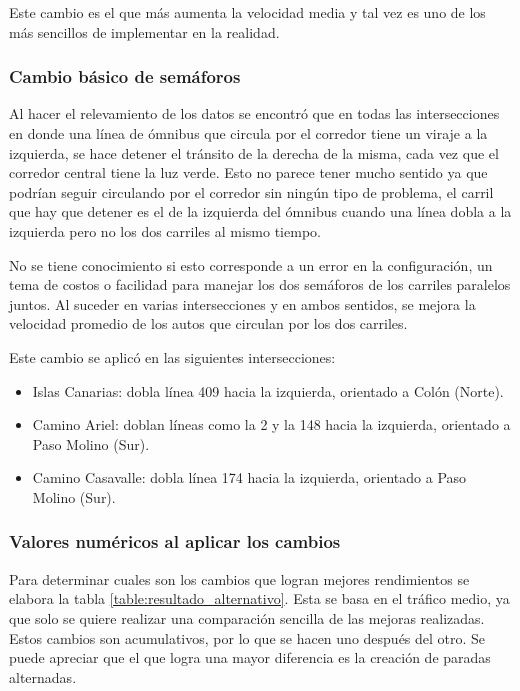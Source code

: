 Este cambio es el que más aumenta la velocidad media y tal vez es uno de los más sencillos de implementar en la realidad.



\subsubsection{Cambio básico de semáforos}
Al hacer el relevamiento de los datos se encontró que en todas las intersecciones en donde una línea de ómnibus que circula por el corredor tiene un viraje a la izquierda, se hace detener el tránsito de la derecha de la misma, cada vez que el corredor central tiene la luz verde. Esto no parece tener mucho sentido ya que podrían seguir circulando por el corredor sin ningún tipo de problema, el carril que hay que detener es el de la izquierda del ómnibus cuando una línea dobla a la izquierda pero no los dos carriles al mismo tiempo.

No se tiene conocimiento si esto corresponde a un error en la configuración, un tema de costos o facilidad para manejar los dos semáforos de los carriles paralelos juntos. Al suceder en varias intersecciones y en ambos sentidos, se mejora la velocidad promedio de los autos que circulan por los dos carriles.

Este cambio se aplicó en las siguientes intersecciones:
\begin{itemize}
	\item Islas Canarias: dobla línea 409 hacia la izquierda, orientado a Colón (Norte).
	\item Camino Ariel: doblan líneas como la  2 y la 148 hacia la izquierda, orientado a Paso Molino (Sur). 
	\item Camino Casavalle: dobla línea 174 hacia la izquierda, orientado a Paso Molino (Sur). 
\end{itemize}

\subsubsection{Valores numéricos al aplicar los cambios}

Para determinar cuales son los cambios que logran mejores rendimientos se elabora la tabla \ref{table:resultado_alternativo}. Esta se basa en el tráfico medio, ya que solo se quiere realizar una comparación sencilla de las mejoras realizadas. Estos cambios son acumulativos, por lo que se hacen uno después del otro. Se puede apreciar que el que logra una mayor diferencia es la creación de paradas alternadas.


